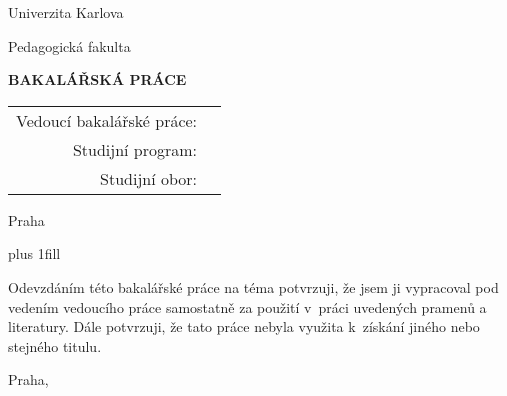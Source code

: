 \pagestyle{empty}
\hypersetup{pageanchor=false}

\begin{center}

{\Large Univerzita Karlova}

\vspace{4mm}

{\Large Pedagogická fakulta}

\vspace{4mm}

\Department

\vspace{-8mm}
\vfill

{\bf\Large BAKALÁŘSKÁ PRÁCE}

\vfill

{\LARGE\bfseries\Title}

\vspace{8mm}

{\LARGE\bfseries\TitleEN}

\vspace{15mm}

{\LARGE\Author}

\vfill

\begin{tabularx}{\textwidth}{rX}
	Vedoucí bakalářské práce: & \Supervisor \\
	\noalign{\vspace{2mm}}
	Studijní program: & \Study \\
	\noalign{\vspace{2mm}}
	Studijní obor: & \StudyField \\
\end{tabularx}

\vfill

Praha \Year

\end{center}

\newpage

\hypersetup{pageanchor=true}
\vglue 0pt plus 1fill

\noindent
Odevzdáním této bakalářské práce na téma \Title{} potvrzuji, že jsem ji  vypracoval pod vedením vedoucího práce samostatně za použití v~práci uvedených pramenů a literatury. Dále potvrzuji, že tato práce nebyla využita k~získání jiného nebo stejného titulu.
\vspace{10mm}

Praha, \Date{} \Year

\vspace{20mm}

